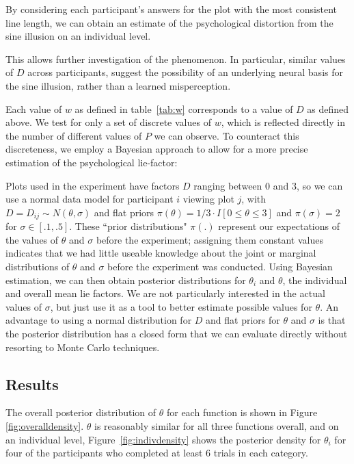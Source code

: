 \documentclass[journal]{vgtc}\usepackage{graphicx, color}
\begin{document}
%
By considering each participant's answers for the plot with the most consistent line length, we can obtain an estimate of the psychological distortion from the sine illusion on an individual level. 

This allows further investigation of the phenomenon.
In particular, similar values of $D$  across participants,   suggest the possibility of an underlying neural basis for the sine illusion, rather than a learned misperception. 

Each value of $w$ as defined in table~\ref{tab:w} corresponds  to a value of $D$ as defined above. 
We test for only a set of discrete values of $w$, which is reflected directly in the number of different values of $P$ we can observe. 
To counteract this discreteness, we employ a Bayesian approach to allow for a more precise estimation of the psychological lie-factor:

Plots used in the experiment have factors $D$ ranging between 0 and 3,  so we can use a normal data model for participant $i$ viewing plot $j$, with $D = D_{ij} \sim N(\theta, \sigma)$ and flat priors $\pi(\theta)=1/3\cdot I[0\leq\theta\leq 3]$ and $\pi(\sigma)=2$ for $\sigma\in[.1, .5]$. These ``prior distributions" $\pi(.)$ represent our expectations of the values of $\theta$ and $\sigma$ before the experiment; assigning them constant values indicates that we had little useable knowledge about the joint or marginal distributions of $\theta$ and $\sigma$ before the experiment was conducted. Using Bayesian estimation, we can then obtain posterior distributions for $\theta_i$ and $\theta$, the individual and overall mean lie factors. We are not particularly interested in the actual values of $\sigma$, but just use it as a tool to better estimate possible values for $\theta$.
An  advantage to using a normal distribution for $D$ and flat priors for $\theta$ and $\sigma$ is that the posterior distribution has a closed form that we can evaluate directly without resorting to Monte Carlo techniques.

\subsection{Results}
The overall posterior distribution of $\theta$ for each function is shown in Figure \ref{fig:overalldensity}. $\theta$ is reasonably similar for all three functions overall, and on an individual level, 
Figure~\ref{fig:indivdensity} shows the posterior density for $\theta_i$ for four of the participants who completed at least 6 trials in each category. 
\end{document}
